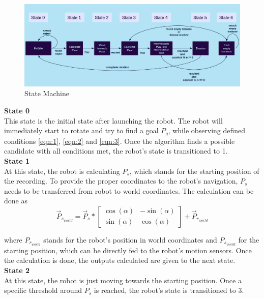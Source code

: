 \begin{figure}[H]%
\centering
\includegraphics[width=1\textwidth]{Bilder/StateMachineChart.png} 
\caption[]{State Machine}
\label{statemachine}
\end{figure}

\newpage

\textbf{State 0}\\
This state is the initial state after launching the robot. The robot will immediately start to rotate and try to find a goal $ P_{g} $, while observing defined conditions \ref{eqn:1}, \ref{eqn:2} and \ref{eqn:3}. Once the algorithm finds a possible candidate with all conditions met, the robot's state is transitioned to 1.\\

\textbf{State 1}\\
At this state, the robot is calculating $ P_{s} $, which stands for the
starting position of the recording. To provide the proper coordinates to the robot's navigation, $ P_{s} $ needs to be transferred from robot to world coordinates. The calculation can be done as
\begin{equation}
\label{eqn:4} 
\vec{P}_{s_{world}}=
\vec{P}_{s}*
  \begin{bmatrix}
    \cos(\alpha) & -\sin(\alpha)\\
    \sin(\alpha) & \cos(\alpha)
  \end{bmatrix}+
\vec{P}_{r_{world}}
\end{equation}

where $ P_{r_{world}} $ stands for the robot's position in world coordinates and $ P_{s_{world}} $ for the starting position, which can be directly fed to the robot's motion sensors. Once the calculation is done, the outputs calculated are given to the next state.\\

\textbf{State 2}\\
At this state, the robot is just moving towards the starting position. Once a specific threshold around $ P_{s} $ is reached, the robot's state is transitioned to 3.\\

